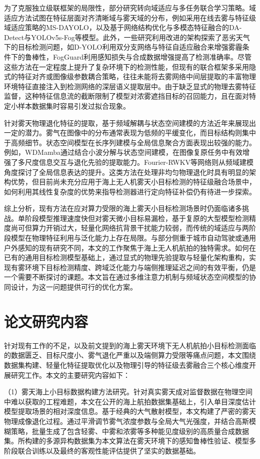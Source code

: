 为了克服独立级联框架的局限性，部分研究转向域适应与多任务联合学习策略。域适应方法试图在特征层面对齐清晰域与雾天域的分布，例如采用在线去雾与特征级域适应策略的MS-DAYOLO，以及基于网络结构优化与多模态特征融合的DA-Detect与YOLOv5s-Fog等模型。此外，一些研究利用改进的架构探索了恶劣天气下的目标检测问题，如D-YOLO利用双分支网络与特征自适应融合来增强雾霾条件下的鲁棒性，FogGuard利用感知损失与合成数据增强提高了检测准确率。尽管这些方法在一定程度上提升了复杂环境下的检测性能，但现有的联合框架多采用隐式的特征对齐或图像级参数耦合策略，往往未能将去雾网络中间层提取的丰富物理环境特征直接注入到检测网络的深层语义提取层中。由于缺乏显式的物理去雾特征监督，这种特征信息流的截断限制了模型对浓雾遮挡目标的召回能力，且在面对特定小样本数据集时容易引发过拟合现象。

针对雾天物理退化特征的提取，基于频域解耦与状态空间建模的方法近年来展现出一定的潜力。雾气在图像中的分布通常表现为低频的平缓变化，而目标结构则集中于高频细节。状态空间模型在长序列建模与全局信息聚合方面表现出较强的能力。例如，WDMamba通过结合小波分解与状态空间建模，在图像复原任务中有效增强了多尺度信息交互与退化先验的提取能力。Fourier-RWKV等网络则从频域建模角度探讨了全局信息表达的提升。这类方法在处理非均匀物理退化时具有明显的架构优势，但目前尚未充分应用于海上无人机雾天小目标检测的特征级融合场景中，如何利用其线性复杂度的优势来指导检测器进行定向特征补偿仍有待进一步探索。

综上分析，现有方法在应对算力受限的海上雾天小目标检测场景时仍面临诸多挑战。单阶段模型推理速度快但对雾天微小目标易漏检，基于复原的大型模型检测精度尚可但算力开销过大，轻量化网络抗背景干扰能力较弱，而传统的域适应与两阶段模型在物理特征利用与泛化能力上存在局限。与部分侧重于城市自动驾驶或通用户外感知的现有研究不同，本文的工作聚焦于海上无人机航拍的独特需求。如何在已有的通用目标检测模型基础上，通过显式的物理先验提取与轻量化架构重构，实现有雾环境下目标检测精度、跨域泛化能力与端侧推理延迟之间的有效平衡，仍是一个需要不断探讨的课题。本文旨在通过多维注意力机制与频域状态空间模型的协同设计，为这一问题提供可行的优化方案。


\section{论文研究内容}
\label{sec:research_content}

针对现有工作的不足，以及前文提到的海上雾天环境下无人机航拍小目标检测面临的数据匮乏、目标尺度小、雾气退化严重以及端侧算力受限等痛点问题，本文围绕数据集构建、轻量化特征提取优化以及物理引导的特征级去雾融合三个核心维度开展研究工作。本文的主要研究内容如下：

{（1）雾天海上小目标数据构建方法研究}。针对真实雾天成对监督数据在物理空间中难以获取的工程难题，本文在公开的海上航拍数据集基础上，引入单目深度估计模型提取场景的相对深度信息。基于经典的大气散射模型，本文构建了严密的雾天物理成像退化过程。通过平滑调节雾气浓度参数与全局大气光强度，并结合高斯模糊策略，批量生成了包含轻雾、中雾和浓雾等多种能见度级别的高质量合成数据集。所构建的多源异构数据集为本文算法在雾天环境下的感知鲁棒性验证、模型多阶段联合训练以及最终的客观性能评估提供了坚实的数据基础。

